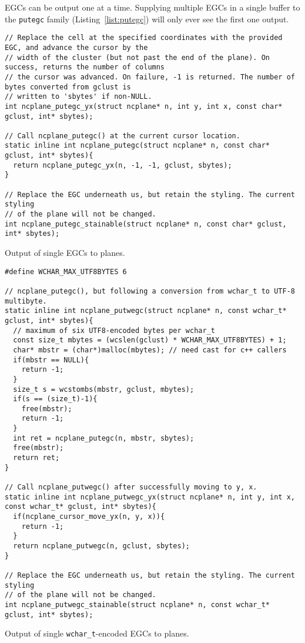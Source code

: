 EGCs can be output one at a time. Supplying multiple EGCs in a single buffer
to the \texttt{putegc} family (Listing~\ref{list:putegc}) will only ever see the first one output.

\begin{listing}[!htb]
\begin{verbatim}
// Replace the cell at the specified coordinates with the provided EGC, and advance the cursor by the
// width of the cluster (but not past the end of the plane). On success, returns the number of columns
// the cursor was advanced. On failure, -1 is returned. The number of bytes converted from gclust is
// written to 'sbytes' if non-NULL.
int ncplane_putegc_yx(struct ncplane* n, int y, int x, const char* gclust, int* sbytes);

// Call ncplane_putegc() at the current cursor location.
static inline int ncplane_putegc(struct ncplane* n, const char* gclust, int* sbytes){
  return ncplane_putegc_yx(n, -1, -1, gclust, sbytes);
}

// Replace the EGC underneath us, but retain the styling. The current styling
// of the plane will not be changed.
int ncplane_putegc_stainable(struct ncplane* n, const char* gclust, int* sbytes);
\end{verbatim}
\caption{Output of single EGCs to planes.}
\label{list:putegc}
\end{listing}

\begin{listing}[!htb]
\begin{verbatim}
#define WCHAR_MAX_UTF8BYTES 6

// ncplane_putegc(), but following a conversion from wchar_t to UTF-8 multibyte.
static inline int ncplane_putwegc(struct ncplane* n, const wchar_t* gclust, int* sbytes){
  // maximum of six UTF8-encoded bytes per wchar_t
  const size_t mbytes = (wcslen(gclust) * WCHAR_MAX_UTF8BYTES) + 1;
  char* mbstr = (char*)malloc(mbytes); // need cast for c++ callers
  if(mbstr == NULL){
    return -1;
  }
  size_t s = wcstombs(mbstr, gclust, mbytes);
  if(s == (size_t)-1){
    free(mbstr);
    return -1;
  }
  int ret = ncplane_putegc(n, mbstr, sbytes);
  free(mbstr);
  return ret;
}

// Call ncplane_putwegc() after successfully moving to y, x.
static inline int ncplane_putwegc_yx(struct ncplane* n, int y, int x, const wchar_t* gclust, int* sbytes){
  if(ncplane_cursor_move_yx(n, y, x)){
    return -1;
  }
  return ncplane_putwegc(n, gclust, sbytes);
}

// Replace the EGC underneath us, but retain the styling. The current styling
// of the plane will not be changed.
int ncplane_putwegc_stainable(struct ncplane* n, const wchar_t* gclust, int* sbytes);
\end{verbatim}
\caption{Output of single \texttt{wchar\_t}-encoded EGCs to planes.}
\label{list:putwegc}
\end{listing}


